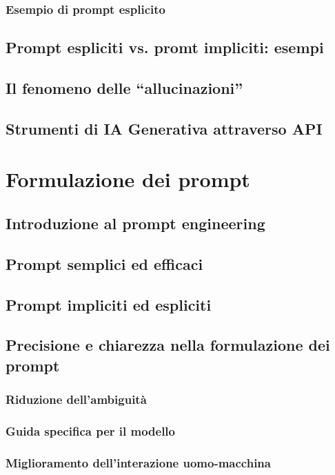         \subsubsection{Esempio di prompt esplicito}
    \subsection{Prompt espliciti vs. promt impliciti: esempi}
    \subsection{Il fenomeno delle ``allucinazioni''}
    \subsection{Strumenti di IA Generativa attraverso API}

\section{Formulazione dei prompt}
    \subsection{Introduzione al prompt engineering}
    \subsection{Prompt semplici ed efficaci}
    \subsection{Prompt impliciti ed espliciti}
    \subsection{Precisione e chiarezza nella formulazione dei prompt}
        \subsubsection{Riduzione dell’ambiguità}
        \subsubsection{Guida specifica per il modello}
        \subsubsection{Miglioramento dell’interazione uomo-macchina}

